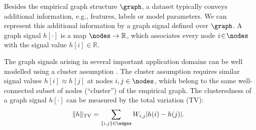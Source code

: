\documentclass[12pt]{report}
\begin{document}
%
%

Besides the empirical graph structure $\graph$, a dataset 
typically conveys additional information, e.g., features, labels 
or model parameters. We can represent this additional 
information by a graph signal defined over $\graph$. 
A graph signal $h[\cdot]$ is a map $\nodes \rightarrow \mathbb{R}$, 
which associates every node $i\!\in\!\nodes$ with the signal 
value $h[i] \!\in\! \mathbb{R}$. 

The graph signals arising in several important application domains can 
be well modelled using a cluster assumption \cite{SemiSupervisedBook}. 
The cluster assumption requires similar signal values $h[i] \approx h[j]$ 
at nodes $i,j \in \nodes$, which belong to the same well-connected 
subset of nodes (``cluster'') of the empirical graph. The clusteredness 
of a graph signal $h[\cdot]$ can be measured by the total variation (TV): 
\begin{equation}
\label{equ_def_TV}
 \| h \|_{\rm TV} = \sum_{\{i,j\} \in \edges} W_{i,j} |h(i) - h(j)|. 
\end{equation} 
 
\end{document}
